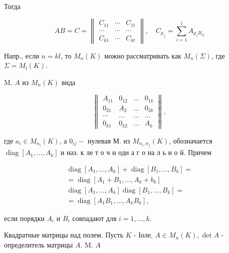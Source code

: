 \documentclass[10pt]{article}
\begin{document}
Тогда



\[

A B=C=\left\|\begin{array}{ccc}

C_{11} & \cdots & C_{1 t} \\

\cdots & \cdots & \cdots \\

C_{k 1} & \cdots & C_{k t}

\end{array}\right\|, \quad C_{\mu_{j}}=\sum_{i=1}^{l} A_{\mu_{i} B_{i j}}

\]



Напр., если $n=k l$, то $M_{n}(K)$ можно рассматривать как $M_{n}(\Sigma)$, где $\Sigma=M_{l}(K)$.



M. $A$ из $M_{n}(K)$ вида



\[

\left\|\begin{array}{cccc}

A_{11} & 0_{12} & \ldots & 0_{1 k} \\

0_{21} & A_{2} & \ldots & 0_{2 k} \\

\cdots & \ldots & \ldots & \ldots \\

0_{k 1} & 0_{k 2} & \ldots & A_{k}

\end{array}\right\|,

\]



где $a_{i} \in M_{n_{i}}(K)$, а $0_{i j}-$ нулевая М. из $M_{n_{i}, n_{j}}(K)$, обозначается $\operatorname{diag}\left[A_{1}, \ldots, A_{k}\right]$ и наз. к ле т о ч н оди а г о на л ь н о й. Причем



\[

\begin{gathered}

\operatorname{diag}\left[A_{1}, \ldots, A_{k}\right]+\operatorname{diag}\left[B_{1}, \ldots, B_{k}\right]= \\

=\operatorname{diag}\left[A_{1}+B_{1}, \ldots, A_{k}+b_{k}\right] \\

\operatorname{diag}\left[A_{1}, \ldots, A_{k}\right] \operatorname{diag}\left[B_{1}, \ldots, B_{k}\right]= \\

=\operatorname{diag}\left[A_{1} B_{1}, \ldots, A_{k} B_{k}\right],

\end{gathered}

\]



если порядки $A_{i}$ и $B_{i}$ совпадают для $i=1, \ldots, k$.



Квадратные матрицы над полем. Пусть $K$ - Іоле, $A \in M_{n}(K), \operatorname{det} A$ - определитель матрицы $A$. M. $A$
\end{document}
